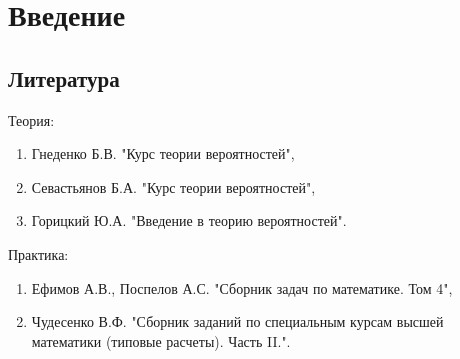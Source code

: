 \chapter*{Введение}


\section*{Литература}

Теория:
\begin{enumerate}
    \item Гнеденко Б.В. "Курс теории вероятностей"{},
    \item Севастьянов Б.А. "Курс теории вероятностей"{},
    \item Горицкий Ю.А. "Введение в теорию вероятностей"{}.
\end{enumerate}

Практика:
\begin{enumerate}
    \item Ефимов А.В., Поспелов А.С. "Сборник задач по математике. Том 4"{},
    \item Чудесенко В.Ф. "Сборник заданий по специальным курсам высшей математики (типовые расчеты). Часть II."{}.
\end{enumerate}

